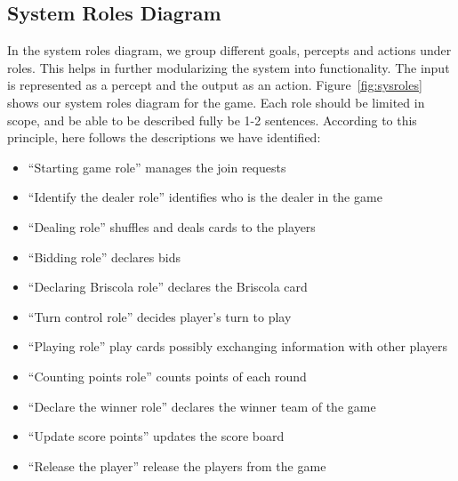 \documentclass[a4paper]{article}
\begin{document}
\subsection{System Roles Diagram}

In the system roles diagram, we group different goals, percepts and actions under roles. This helps in further modularizing the system into functionality. The input is represented as a percept and the output as an action. Figure~\ref{fig:sysroles} shows our system roles diagram for the game. Each role should be limited in scope, and be able to be described fully be 1-2 sentences. According to this principle, here follows the descriptions we have identified:
\begin{itemize}
  \item ``Starting game role'' manages the join requests
  \item ``Identify the dealer role'' identifies who is the dealer in the game
  \item ``Dealing role'' shuffles and deals cards to the players
  \item ``Bidding role'' declares bids
  \item ``Declaring Briscola role'' declares the Briscola card
  \item ``Turn control role'' decides player's turn to play
  \item ``Playing role'' play cards possibly exchanging information with other players
  \item ``Counting points role'' counts points of each round
  \item ``Declare the winner role'' declares the winner team of the game
  \item ``Update score points'' updates the score board 
  \item ``Release the player'' release the players from the game
\end{itemize} 
\end{document}
